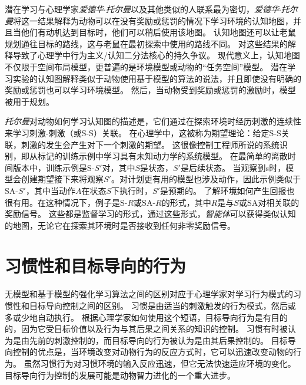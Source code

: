 潜在学习与心理学家\textit{爱德华$\cdot$托尔曼}以及其他类似的人联系最为密切，\textit{爱德华$\cdot$托尔曼}将这一结果解释为动物可以在没有奖励或惩罚的情况下学习环境的认知地图，并且当他们有动机达到目标时，他们可以稍后使用该地图\cite{tolman1948cognitive}。
认知地图还可以让老鼠规划通往目标的路线，这与老鼠在最初探索中使用的路线不同。
对这些结果的解释导致了心理学中行为主义/认知二分法核心的持久争议。
现代意义上，认知地图不仅限于空间布局模型，更普遍的是环境模型或动物的“任务空间”模型\cite{wilson2014orbitofrontal}。
潜在学习实验的认知图解释类似于动物使用基于模型的算法的说法，并且即使没有明确的奖励或惩罚也可以学习环境模型。
然后，当动物受到奖励或惩罚的激励时，模型被用于规划。


\textit{托尔曼}对动物如何学习认知图的描述是，它们通过在探索环境时经历刺激的连续性来学习刺激-刺激（或S-S）关联。
在心理学中，这被称为期望理论：给定S-S关联，刺激的发生会产生对下一个刺激的期望。
这很像控制工程师所说的系统识别，即从标记的训练示例中学习具有未知动力学的系统模型。
在最简单的离散时间版本中，训练示例是S-$S'$对，其中$S$是状态，$S'$是后续状态。
当观察到s时，模型会创建期望接下来将观察$S'$。对计划更有用的模型也涉及动作，因此示例类似于SA-$S'$，其中当动作$ A $在状态$ S $下执行时，$ S' $是预期的。
了解环境如何产生回报也很有用。在这种情况下，例子是S-$ R $或SA-$ R $的形式，其中$ R $是与$ S $或SA对相关联的奖励信号。
这些都是监督学习的形式，通过这些形式，\textit{智能体}可以获得类似认知的地图，无论它在探索其环境时是否接收到任何非零奖励信号。


\section{习惯性和目标导向的行为} \label{sec:habitual_behavior}

无模型和基于模型的强化学习算法之间的区别对应于心理学家对学习行为模式的习惯性和目标导向控制之间的区别。
习惯是由适当的刺激触发的行为模式，然后或多或少地自动执行。
根据心理学家如何使用这个短语，目标导向行为是有目的的，因为它受目标价值以及行为与其后果之间关系的知识的控制。
习惯有时被认为是由先前的刺激控制的，而目标导向的行为被认为是由其后果控制的\cite{dickinson1980contemporary,dickinson1985actions}。
目标导向控制的优点是，当环境改变对动物行为的反应方式时，它可以迅速改变动物的行为。
虽然习惯行为对习惯环境的输入反应迅速，但它无法快速适应环境的变化。
目标导向行为控制的发展可能是动物智力进化的一个重大进步。



